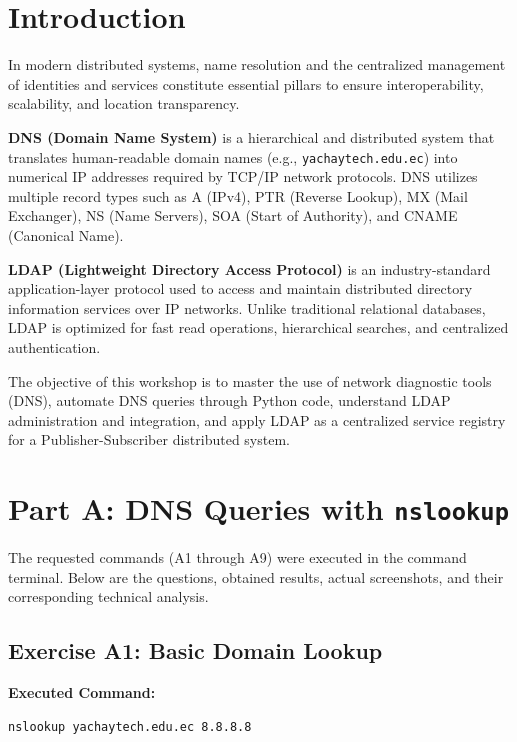 \documentclass[12pt,a4paper]{article}
\begin{document}
\section{Introduction}
In modern distributed systems, name resolution and the centralized management of identities and services constitute essential pillars to ensure interoperability, scalability, and location transparency. 

\textbf{DNS (Domain Name System)} is a hierarchical and distributed system that translates human-readable domain names (e.g., \texttt{yachaytech.edu.ec}) into numerical IP addresses required by TCP/IP network protocols. DNS utilizes multiple record types such as A (IPv4), PTR (Reverse Lookup), MX (Mail Exchanger), NS (Name Servers), SOA (Start of Authority), and CNAME (Canonical Name).

\textbf{LDAP (Lightweight Directory Access Protocol)} is an industry-standard application-layer protocol used to access and maintain distributed directory information services over IP networks. Unlike traditional relational databases, LDAP is optimized for fast read operations, hierarchical searches, and centralized authentication.

The objective of this workshop is to master the use of network diagnostic tools (DNS), automate DNS queries through Python code, understand LDAP administration and integration, and apply LDAP as a centralized service registry for a Publisher-Subscriber distributed system.

\section{Part A: DNS Queries with \texttt{nslookup}}
The requested commands (A1 through A9) were executed in the command terminal. Below are the questions, obtained results, actual screenshots, and their corresponding technical analysis.

\subsection{Exercise A1: Basic Domain Lookup}
\textbf{Executed Command:}
\begin{lstlisting}[language=bash]
nslookup yachaytech.edu.ec 8.8.8.8
\end{lstlisting}
\end{document}
